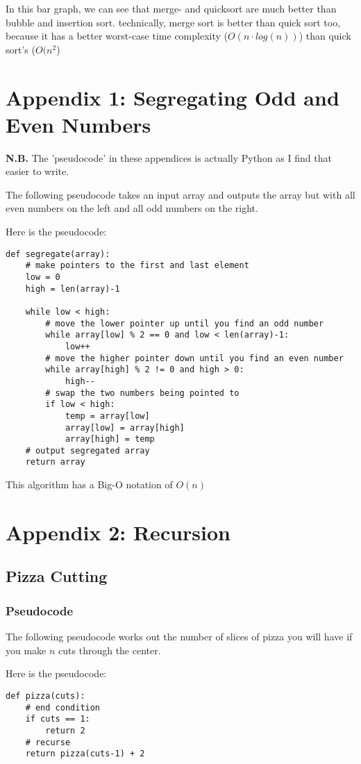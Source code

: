\documentclass{report}
\begin{document}
In this bar graph, we can see that merge- and quicksort are much better than bubble and insertion sort. technically, merge sort is better than quick sort too, because it has a better worst-case time complexity ($O(n\cdot log(n))$) than quick sort's ($O(n^2$)

\chapter*{Appendix 1: Segregating Odd and Even Numbers}
\textbf{N.B.} The 'pseudocode' in these appendices is actually Python as I find that easier to write.

The following pseudocode takes an input array and outputs the array but with all even numbers on the left and all odd numbers on the right.

Here is the pseudocode:
\begin{verbatim}
def segregate(array):
    # make pointers to the first and last element
    low = 0
    high = len(array)-1
    
    while low < high:
        # move the lower pointer up until you find an odd number
        while array[low] % 2 == 0 and low < len(array)-1:
            low++
        # move the higher pointer down until you find an even number
        while array[high] % 2 != 0 and high > 0:
            high--
        # swap the two numbers being pointed to
        if low < high:
            temp = array[low]
            array[low] = array[high]
            array[high] = temp
    # output segregated array
    return array
\end{verbatim}
This algorithm has a Big-O notation of $O(n)$

\chapter*{Appendix 2: Recursion}
\section*{Pizza Cutting}
\subsection*{Pseudocode}
The following pseudocode works out the number of slices of pizza you will have if you make $n$ cuts through the center.

Here is the pseudocode:
\begin{verbatim}
def pizza(cuts):
    # end condition
    if cuts == 1:
        return 2
    # recurse
    return pizza(cuts-1) + 2
\end{verbatim}
\end{document}
